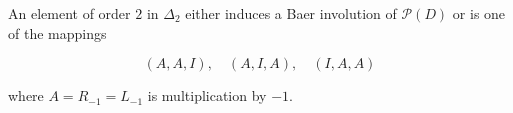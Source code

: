 An element of order $2$ in $\Delta_2$ either induces a Baer involution of $\mathcal{P}(D)$ or is one of the mappings

$$(A, A, I),\quad (A, I, A),\quad (I, A, A)$$

where $A = R_{-1} = L_{-1}$ is multiplication by $-1$.
